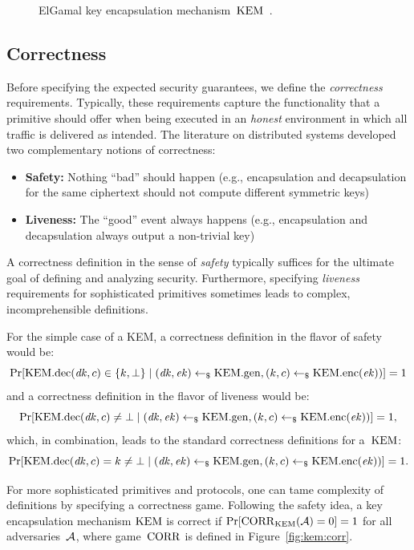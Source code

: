 \begin{figure}[!ht]
    \centering
    \nicoresetlinenr%
    \fbox{%
        \scalebox{\codescalefactor}{%
        }%
    }
    \caption{%
        ElGamal key encapsulation mechanism~$\mathrm{KEM}$~\cite{ElGamal85}.
    }
    \label{fig:kem:const:elgamal}
\end{figure}

\subsection{Correctness}
Before specifying the expected security guarantees, we define the \emph{correctness} requirements.
Typically, these requirements capture the functionality that a primitive should offer when being executed in an \emph{honest} environment in which all traffic is delivered as intended.
The literature on distributed systems developed two complementary notions of correctness:
\begin{itemize}
    \item \textbf{Safety:} Nothing ``bad'' should happen (e.g., encapsulation and decapsulation for the same ciphertext should not compute different symmetric keys)
    \item \textbf{Liveness:} The ``good'' event always happens (e.g., encapsulation and decapsulation always output a non-trivial key)
\end{itemize}

A correctness definition in the sense of \emph{safety} typically suffices for the ultimate goal of defining and analyzing security.
Furthermore, specifying \emph{liveness} requirements for sophisticated primitives sometimes leads to complex, incomprehensible definitions.

For the simple case of a KEM, a correctness definition in the flavor of safety would be:
\[
\Pr[\mathrm{KEM}.\mathrm{dec}(\mathit{dk},c)\in\{k,\bot\}\mid (\mathit{dk},\mathit{ek})\gets_\$\mathrm{KEM}.\mathrm{gen},(k,c)\gets_\$\mathrm{KEM}.\mathrm{enc}(\mathit{ek}))]=1
\]
and a correctness definition in the flavor of liveness would be:
\[
\Pr[\mathrm{KEM}.\mathrm{dec}(\mathit{dk},c)\neq\bot\mid (\mathit{dk},\mathit{ek})\gets_\$\mathrm{KEM}.\mathrm{gen},(k,c)\gets_\$\mathrm{KEM}.\mathrm{enc}(\mathit{ek}))]=1\text{,}
\]
which, in combination, leads to the standard correctness definitions for a~$\mathrm{KEM}$:
\[
\Pr[\mathrm{KEM}.\mathrm{dec}(\mathit{dk},c)=k\neq\bot\mid (\mathit{dk},\mathit{ek})\gets_\$\mathrm{KEM}.\mathrm{gen},(k,c)\gets_\$\mathrm{KEM}.\mathrm{enc}(\mathit{ek}))]=1\text{.}
\]

For more sophisticated primitives and protocols, one can tame complexity of definitions by specifying a correctness game.
Following the safety idea, a key encapsulation mechanism $\mathrm{KEM}$ is correct if $\Pr[\mathrm{CORR}_{\mathrm{KEM}}(\mathcal{A})=0]=1$ for all adversaries~$\mathcal{A}$, where game~$\mathrm{CORR}$ is defined in Figure~\ref{fig:kem:corr}.


